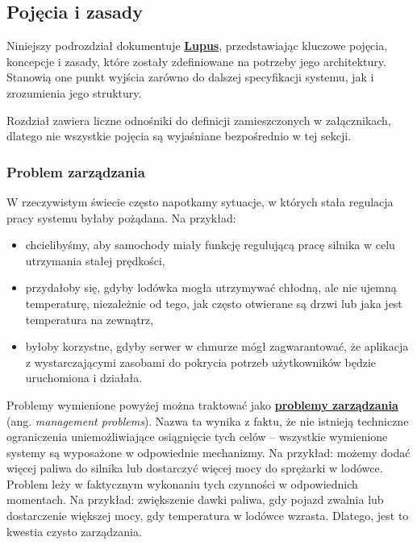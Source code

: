 \subsection{Pojęcia i zasady}\label{sec:33}

Niniejszy podrozdział dokumentuje \hyperlink{def:lupus}{\textbf{Lupus}}, przedstawiając kluczowe pojęcia, koncepcje i zasady, które zostały zdefiniowane na potrzeby jego architektury. Stanowią one punkt wyjścia zarówno do dalszej specyfikacji systemu, jak i zrozumienia jego struktury.

Rozdział zawiera liczne odnośniki do definicji zamieszczonych w załącznikach, dlatego nie wszystkie pojęcia są wyjaśniane bezpośrednio w tej sekcji.

\subsubsection{Problem zarządzania}

W rzeczywistym świecie często napotkamy sytuacje, w których stała regulacja pracy systemu byłaby pożądana. Na przykład:
\begin{itemize}
    \item chcielibyśmy, aby samochody miały funkcję regulującą pracę silnika w celu utrzymania stałej prędkości,
    \item przydałoby się, gdyby lodówka mogła utrzymywać chłodną, ale nie ujemną temperaturę, niezależnie od tego, jak często otwierane są drzwi lub jaka jest temperatura na zewnątrz,
    \item byłoby korzystne, gdyby serwer w chmurze mógł zagwarantować, że aplikacja z wystarczającymi zasobami do pokrycia potrzeb użytkowników będzie uruchomiona i działała.
\end{itemize}

Problemy wymienione powyżej można traktować jako \hyperlink{def:problem-zarzadzania}{\textbf{problemy zarządzania}} (ang. \textit{management problems}). Nazwa ta wynika z faktu, że nie istnieją techniczne ograniczenia uniemożliwiające osiągnięcie tych celów – wszystkie wymienione systemy są wyposażone w odpowiednie mechanizmy. Na przykład: możemy dodać więcej paliwa do silnika lub dostarczyć więcej mocy do sprężarki w lodówce. Problem leży w faktycznym wykonaniu tych czynności w odpowiednich momentach. Na przykład: zwiększenie dawki paliwa, gdy pojazd zwalnia lub dostarczenie większej mocy, gdy temperatura w lodówce wzrasta. Dlatego, jest to kwestia czysto zarządzania.

